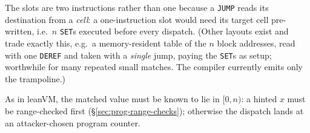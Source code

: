 The slots are two instructions rather than one because a \texttt{JUMP} reads its destination from a \emph{cell}: a one-instruction slot would need its target cell pre-written, i.e.\ $n$ \texttt{SET}s executed before every dispatch. (Other layouts exist and trade exactly this, e.g.\ a memory-resident table of the $n$ block addresses, read with one \texttt{DEREF} and taken with a \emph{single} jump, paying the \texttt{SET}s as setup; worthwhile for many repeated small matches. The compiler currently emits only the trampoline.)

As in leanVM, the matched value must be known to lie in $[0,n)$: a hinted $x$ must be range-checked first (\S\ref{sec:prog-range-checks}); otherwise the dispatch lands at an attacker-chosen program counter.
